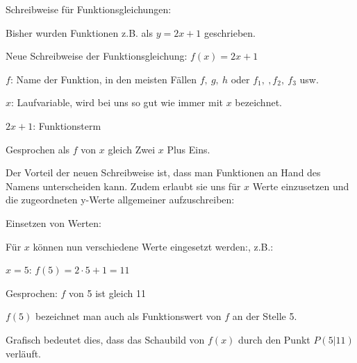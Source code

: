 \begin{tcolorbox}
    Schreibweise für Funktionsgleichungen:

    \bigskip

    \textcolor{loestc}{Bisher wurden Funktionen z.B. als \(y=2x+1\) geschrieben.}

    \bigskip

    \textcolor{loestc}{Neue Schreibweise der Funktionsgleichung: \(f(x)=2x+1\)}

    \bigskip

    \textcolor{loestc}{\(f\): Name der Funktion, in den meisten Fällen \(f,\ g,\ h\) oder \(f_1,\ ,f_2,\ f_3\) usw.}

    \bigskip

    \textcolor{loestc}{\(x\): Laufvariable, wird bei uns so gut wie immer mit \(x\) bezeichnet.}

    \bigskip

    \textcolor{loestc}{\(2x+1\): Funktionsterm}

    \bigskip

    \textcolor{loestc}{Gesprochen als \(f\) von \(x\) gleich Zwei \(x\) Plus Eins.}
\end{tcolorbox}
Der Vorteil der neuen Schreibweise ist, dass man Funktionen an Hand des Namens unterscheiden kann. Zudem erlaubt sie uns für \(x\) Werte einzusetzen und die zugeordneten y-Werte allgemeiner aufzuschreiben:
\begin{tcolorbox}
    Einsetzen von Werten:

    \bigskip

    \textcolor{loestc}{Für \(x\) können nun verschiedene Werte eingesetzt werden:, z.B.:}

    \bigskip

    \textcolor{loestc}{\(x=5\): \(f(5)=2\cdot 5+1=11\)}

    \bigskip

    \textcolor{loestc}{Gesprochen: \(f\) von 5 ist gleich 11}

    \bigskip

    \textcolor{loestc}{\(f(5)\) bezeichnet man auch als Funktionswert von \(f\) an der Stelle 5.}

    \textcolor{loestc}{Grafisch bedeutet dies, dass das Schaubild von \(f(x)\) durch den Punkt \(P(5|11)\) verläuft.}
\end{tcolorbox}
\newpage
